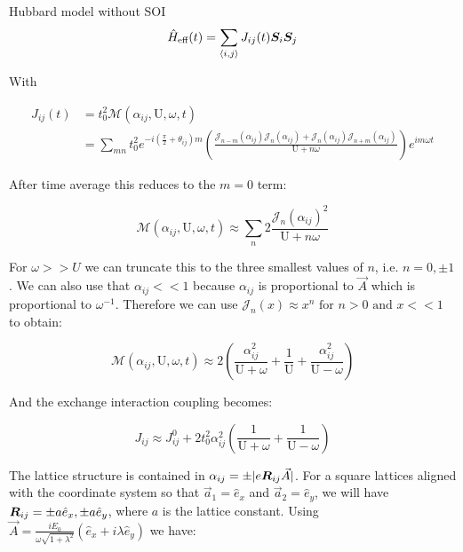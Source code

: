 \begin{section}{Hubbard model without SOI}
\begin{equation}
\hat{H}_{\text{eff}}(t) = \sum_{\langle i,j \rangle} J_{ij}(t) \boldsymbol{S}_i \boldsymbol{S}_j
\end{equation}

With 

\begin{align}
J_{ij}(t) &= t_0^2 \mathcal{M}(\alpha_{ij}, \text{U}, \omega, t) \nonumber \\
&=\sum_{mn} t_0^2 e^{-i(\frac{\pi}{2}+\theta_{ij})m}\left(\frac{\mathcal{J}_{n-m}(\alpha_{ij})\mathcal{J}_{n}(\alpha_{ij})+\mathcal{J}_{n}(\alpha_{ij})\mathcal{J}_{n+m}(\alpha_{ij})}{\text{U}+n\omega} \right) e^{im\omega t} \label{Jij1}
\end{align}

After time average this reduces to the $m=0$ term:

\begin{equation}
\label{MFactorApprox0}
\mathcal{M}(\alpha_{ij}, \text{U}, \omega, t) \approx \sum_{n} 2 \frac{\mathcal{J}_n(\alpha_{ij})^2}{\text{U}+n\omega}
\end{equation}

For $\omega>>U$ we can truncate this to the three smallest values of $n$, i.e. $n=0, \pm 1$. We can also use that $\alpha_{ij} << 1$ because $\alpha_{ij}$ is proportional to $\vec{A}$ which is proportional to $\omega^{-1}$. Therefore we can use $\mathcal{J}_n(x) \approx x^n \text{ for } n>0 \text{ and } x << 1$ to obtain:

\begin{equation}
\label{MFactorApprox}
\mathcal{M}(\alpha_{ij}, \text{U}, \omega, t) \approx 2 \left(\frac{\alpha_{ij}^2}{\text{U}+\omega} +\frac{1}{\text{U}} +\frac{\alpha_{ij}^2}{\text{U}-\omega} \right)
\end{equation}

And the exchange interaction coupling becomes:

\begin{equation}
\label{Jij2}
J_{ij} \approx J_{ij}^0 + 2t_0^2 \alpha_{ij}^2 \left( \frac{1}{\text{U}+\omega} + \frac{1}{\text{U}-\omega} \right)
\end{equation}

The lattice structure is contained in $\alpha_{ij} = \pm|e\boldsymbol{R}_{ij}\vec{A}|$. For a square lattices aligned with the coordinate system so that $\vec{a}_1=\hat{e}_x$ and $\vec{a}_2=\hat{e}_y$, we will have $\boldsymbol{R}_{ij} = \pm a\hat{e}_x,\pm a\hat{e}_y$, where $a$ is the lattice constant. Using $\vec{A}=\frac{iE_0}{\omega\sqrt{1+\lambda^2}}(\hat{e}_x+i\lambda\hat{e}_y)$ we have:


\end{section}

